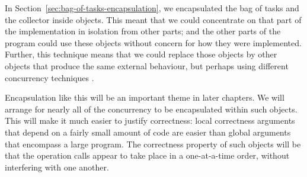 












In Section~\ref{sec:bag-of-tasks-encapsulation}, we encapsulated the bag of
tasks and the collector inside objects.  This meant that we could concentrate
on that part of the implementation in isolation from other parts; and the
other parts of the program could use these objects without concern for how
they were implemented.  Further, this technique means that we could replace
those objects by other objects that produce the same external behaviour, but
perhaps using different concurrency techniques .

Encapsulation like this will be an important theme in later chapters.  We will
arrange for nearly all of the concurrency to be encapsulated within such
objects.  This will make it much easier to justify correctness: local
correctness arguments that depend on a fairly small amount of code are easier
than global arguments that encompass a large program.  The correctness
property of such objects will be that the operation calls appear to take place
in a one-at-a-time order, without interfering with one another.

